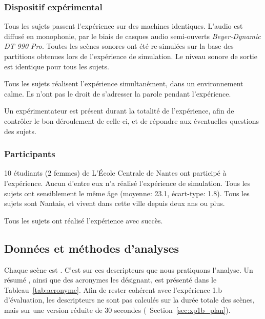 \documentclass[twoside,twocolumn]{article}
\begin{document}

\subsubsection*{Dispositif expérimental} 
Tous les sujets passent l'expérience sur des machines identiques. L'audio est diffusé en monophonie, par le biais de casques audio semi-ouverts \emph{Beyer-Dynamic DT 990 Pro}. Toutes les scènes sonores ont été re-simulées sur la base des partitions obtenues lors de l'expérience de simulation. Le niveau sonore de sortie est identique pour tous les sujets.

Tous les sujets réalisent l'expérience simultanément, dans un environnement calme. Ils n'ont pas le droit de s'adresser la parole pendant l'expérience. 

Un expérimentateur est présent durant la totalité de l'expérience, afin de contrôler le bon déroulement de celle-ci, et de répondre aux éventuelles questions des sujets. 

\subsubsection*{Participants}
10 étudiants (2 femmes) de L’École Centrale de Nantes ont participé à l'expérience. Aucun d'entre eux n'a réalisé l'expérience de simulation. Tous les sujets ont sensiblement le même âge (moyenne: 23.1, écart-type: 1.8). Tous les sujets sont Nantais, et vivent dans cette ville depuis deux ans ou plus.

Tous les sujets ont réalisé l'expérience avec succès.

\subsection{Données et méthodes d'analyses}
\label{sec:xp1_dataAna}

Chaque scène est   . C'est sur ces descripteurs que nous pratiquons l'analyse. Un résumé  , ainsi que des acronymes les désignant, est présenté dans le Tableau~\ref{tab:acronyme}. Afin de rester cohérent avec l’expérience 1.b d'évaluation, les descripteurs ne sont pas calculés sur la durée totale des scènes, mais sur une version réduite de 30 secondes (\cf~Section~\ref{sec:xp1b_plan}). 
\end{document}
